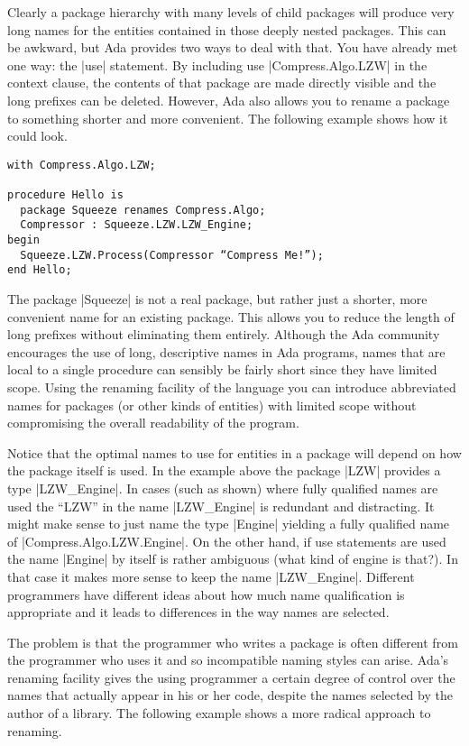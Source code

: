 Clearly a package hierarchy with many levels of child packages will produce very long names for
the entities contained in those deeply nested packages. This can be awkward, but Ada provides
two ways to deal with that. You have already met one way: the |use| statement. By including use
|Compress.Algo.LZW| in the context clause, the contents of that package are made directly
visible and the long prefixes can be deleted. However, Ada also allows you to rename a package
to something shorter and more convenient. The following example shows how it could look.

\begin{lstlisting}
with Compress.Algo.LZW;

procedure Hello is
  package Squeeze renames Compress.Algo;
  Compressor : Squeeze.LZW.LZW_Engine;
begin
  Squeeze.LZW.Process(Compressor “Compress Me!”);
end Hello;
\end{lstlisting}

The package |Squeeze| is not a real package, but rather just a shorter, more convenient name for
an existing package. This allows you to reduce the length of long prefixes without eliminating
them entirely. Although the Ada community encourages the use of long, descriptive names in Ada
programs, names that are local to a single procedure can sensibly be fairly short since they
have limited scope. Using the renaming facility of the language you can introduce abbreviated
names for packages (or other kinds of entities) with limited scope without compromising the
overall readability of the program.

Notice that the optimal names to use for entities in a package will depend on how the package
itself is used. In the example above the package |LZW| provides a type |LZW_Engine|. In cases
(such as shown) where fully qualified names are used the ``LZW'' in the name |LZW_Engine| is
redundant and distracting. It might make sense to just name the type |Engine| yielding a fully
qualified name of |Compress.Algo.LZW.Engine|. On the other hand, if use statements are used the
name |Engine| by itself is rather ambiguous (what kind of engine is that?). In that case it
makes more sense to keep the name |LZW_Engine|. Different programmers have different ideas about
how much name qualification is appropriate and it leads to differences in the way names are
selected.

The problem is that the programmer who writes a package is often different from the programmer
who uses it and so incompatible naming styles can arise. Ada's renaming facility gives the using
programmer a certain degree of control over the names that actually appear in his or her code,
despite the names selected by the author of a library. The following example shows a more
radical approach to renaming.

